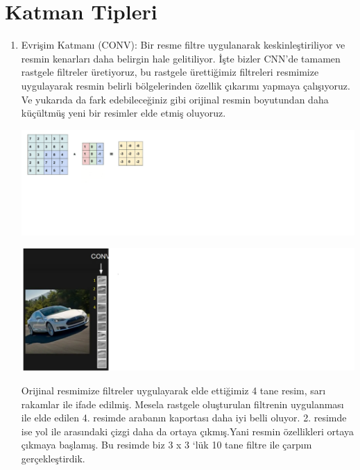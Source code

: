 \documentclass[12pt,a4paper]{article}
\begin{document}
	\vspace{\baselineskip}
	\pagebreak
	\section*{Katman Tipleri}
	\begin{enumerate}
		\item Evrişim Katmanı (CONV): Bir resme  filtre uygulanarak keskinleştiriliyor ve resmin kenarları daha belirgin hale gelitiliyor.
		İşte bizler CNN’de tamamen rastgele filtreler üretiyoruz, bu rastgele ürettiğimiz filtreleri resmimize uygulayarak resmin belirli bölgelerinden özellik çıkarımı yapmaya çalışıyoruz. Ve yukarıda da fark edebileceğiniz gibi orijinal resmin boyutundan daha küçültmüş yeni bir resimler elde etmiş oluyoruz.
		\begin{center}
			\begin{minipage}{0.65\textwidth}
				\centering
				\includegraphics{conver.png}
			\end{minipage}
			\hfill
			\begin{minipage}{0.25\textwidth}
				\centering
				\includegraphics[height=0.5\textheight]{convex.png}
			\end{minipage}
			Orijinal resmimize filtreler uygulayarak elde ettiğimiz 4 tane resim, sarı rakamlar ile ifade edilmiş. Mesela rastgele oluşturulan filtrenin uygulanması ile elde edilen 4. resimde arabanın kaportası daha iyi belli oluyor. 2. resimde ise yol ile arasındaki çizgi daha da ortaya çıkmış.Yani resmin özellikleri ortaya çıkmaya başlamış. Bu resimde biz 3 x 3 ‘lük 10 tane filtre ile çarpım gerçekleştirdik.
			\begin{figure}

\end{figure}
\end{center}
\end{enumerate}
\end{document}
